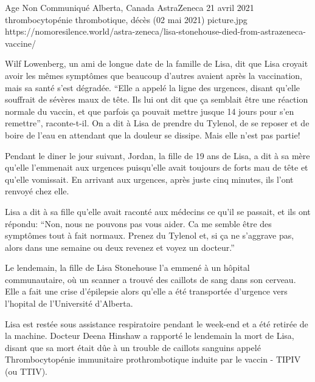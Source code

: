           {Age Non Communiqué}
          {Alberta, Canada}
          {AstraZeneca}
          {21 avril 2021}
          {thrombocytopénie thrombotique,
            décès (02 mai 2021)}
          {picture.jpg}
          {https://nomoresilence.world/astra-zeneca/lisa-stonehouse-died-from-astrazeneca-vaccine/}
          {

Wilf Lowenberg, un ami de longue date de la famille de Lisa, dit que Lisa
croyait avoir les mêmes symptômes que beaucoup d'autres avaient après la
vaccination, mais sa santé s'est dégradée. “Elle a appelé la ligne des urgences,
disant qu'elle souffrait de sévères maux de tête. Ils lui ont dit que ça
semblait être une réaction normale du vaccin, et que parfois ça pouvait mettre
jusque 14 jours pour s'en remettre”, raconte-t-il. On a dit à Lisa de prendre du
Tylenol, de se reposer et de boire de l'eau en attendant que la douleur se
dissipe. Mais elle n'est pas partie!

Pendant le diner le jour suivant, Jordan, la fille de 19 ans de Lisa, a dit à sa
mère qu'elle l'emmenait aux urgences puisqu'elle avait toujours de forts mau de
tête et qu'elle vomissait. En arrivant aux urgences, après juste cinq minutes,
ils l'ont renvoyé chez elle.

Lisa a dit à sa fille qu'elle avait raconté aux médecins ce qu'il se passait, et
ils ont répondu: “Non, nous ne pouvons pas vous aider. Ca me semble être des
symptômes tout à fait normaux. Prenez du Tylenol et, si ça ne s'aggrave pas,
alors dans une semaine ou deux revenez et voyez un docteur.”

Le lendemain, la fille de Lisa Stonehouse l'a emmené à un hôpital communautaire,
où un scanner a trouvé des caillots de sang dans son cerveau. Elle a fait une
crise d'épilepsie alors qu'elle a été transportée d'urgence vers l'hopital de
l'Université d'Alberta.

Lisa est restée sous assistance respiratoire pendant le week-end et a été
retirée de la machine. Docteur Deena Hinshaw a rapporté le lendemain la mort de
Lisa, disant que sa mort était dûe à un trouble de caillots sanguins appelé
Thrombocytopénie immunitaire prothrombotique induite par le vaccin - TIPIV (ou
TTIV).

}

